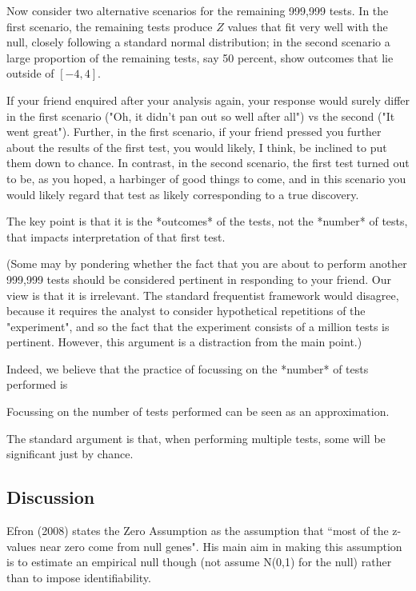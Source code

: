 \documentclass[11pt]{article}
\begin{document}
Now consider two alternative scenarios for the remaining 999,999 tests. In the first scenario, the remaining tests
produce $Z$ values that fit very well with the null, closely following a standard normal distribution; in the second
scenario a large proportion of the remaining tests, say 50 percent, show outcomes that lie outside of $[-4,4]$. 

If your friend enquired after your analysis again, your
response would surely differ in the first scenario ("Oh, it didn't pan out so well after all") vs the second ("It went great"). Further,
in the first scenario, if your friend pressed you further about the results of the first test,
you would likely, I think, be inclined to put them down to chance. In contrast, in the second scenario, the first test turned out to be, as you hoped, a harbinger of good things to come, and in this scenario you would likely regard that test as likely corresponding to a true discovery.

The key point is that it is the *outcomes* of the tests, not the *number* of tests, that impacts interpretation of that first test. 

(Some may by pondering whether the fact that you are about to perform another
999,999 tests should be considered pertinent in responding to your friend. Our view is that it is  irrelevant.
The standard frequentist framework would disagree, because
it requires the analyst to consider hypothetical repetitions
of the "experiment", and so the fact that the experiment
consists of a million tests is pertinent. However, this
argument is a distraction from the main point.)

Indeed, we believe that the practice of focussing on the *number* of tests performed is 

Focussing on the number of tests performed can be
seen as an approximation. 

The standard argument is that,
when performing multiple tests, some will be significant
just by chance.

\subsection{Discussion}

Efron (2008) states the Zero Assumption as the assumption that ``most of the z-values near zero come from null genes".
His main aim in making this assumption is to estimate an empirical null though (not assume N(0,1) for the null)
rather than to impose identifiability.
\end{document}

